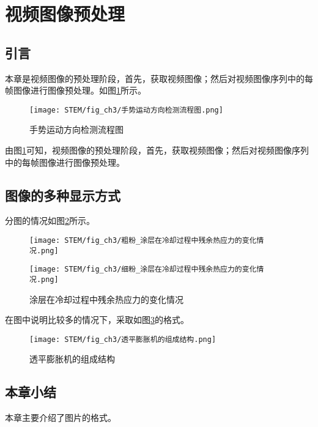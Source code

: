 
\section{视频图像预处理}

\subsection{引言}

本章是视频图像的预处理阶段，首先，获取视频图像；然后对视频图像序列中的每帧图像进行图像预处理。如图\ref{fig:手势运动方向检测流程图}所示。
\begin{figure}[H]
  \centering
  \texttt{[image: STEM/fig\_ch3/手势运动方向检测流程图.png]}
  \caption{手势运动方向检测流程图}
  \label{fig:手势运动方向检测流程图}
\end{figure}

由图\ref{fig:手势运动方向检测流程图}可知，视频图像的预处理阶段，首先，获取视频图像；然后对视频图像序列中的每帧图像进行图像预处理。

\subsection{图像的多种显示方式}

分图的情况如图\ref{fig:涂层在冷却过程中残余热应力的变化情况}所示。
\begin{figure}[H]
    \centering
    \begin{minipage}[c]{0.48\textwidth}
        \centering
        \texttt{[image: STEM/fig\_ch3/粗粉\_涂层在冷却过程中残余热应力的变化情况.png]}
    \end{minipage}
    \begin{minipage}[c]{0.48\textwidth}
        \centering
        \texttt{[image: STEM/fig\_ch3/细粉\_涂层在冷却过程中残余热应力的变化情况.png]}
    \end{minipage}
    \caption{涂层在冷却过程中残余热应力的变化情况}\label{fig:涂层在冷却过程中残余热应力的变化情况}
\end{figure}

在图中说明比较多的情况下，采取如图\ref{fig:透平膨胀机的组成结构}的格式。
\begin{figure}[H]
  \centering
  \texttt{[image: STEM/fig\_ch3/透平膨胀机的组成结构.png]}
  \caption{透平膨胀机的组成结构}
  \label{fig:透平膨胀机的组成结构}
\end{figure}

\subsection{本章小结}

本章主要介绍了图片的格式。

